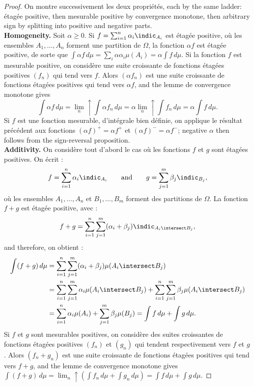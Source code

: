 \begin{proof}
  On montre successivement les deux propriétés, each by the same ladder: étagée
  positive, then mesurable positive by convergence monotone, then arbitrary sign by
  splitting into positive and negative parts.\\

  \textbf{Homogeneity.} Soit $\alpha \geq 0$. Si $f = \sum_{i=1}^{n} \alpha_{i}
  \indic_{A_{i}}$ est étagée positive, où les ensembles $A_{1},\ldots,A_{n}$ forment
  une partition de $\Omega$, la fonction $\alpha f$ est étagée positive, de sorte
  que $\int \alpha f \, d\mu = \sum_{i} \alpha \alpha_{i} \mu(A_{i}) = \alpha \int f
  \, d\mu$. Si la fonction $f$ est mesurable positive, on considère une suite
  croissante de fonctions étagées positives $(f_{n})$ qui tend vers $f$. Alors
  $(\alpha f_{n})$ est une suite croissante de fonctions étagées positives qui tend
  vers $\alpha f$, and the lemme de convergence monotone gives
  \[
    \int \alpha f \, d\mu = \lim_{n} \uparrow \int \alpha f_{n} \, d\mu
    = \alpha \lim_{n} \uparrow \int f_{n} \, d\mu = \alpha \int f \, d\mu .
  \]
  Si $f$ est une fonction mesurable, d'intégrale bien définie, on applique le
  résultat précédent aux fonctions $(\alpha f)^{+} = \alpha f^{+}$ et $(\alpha
  f)^{-} = \alpha f^{-}$; negative $\alpha$ then follows from the sign-reversal
  proposition.\\

  \textbf{Additivity.} On considère tout d'abord le cas où les fonctions $f$ et $g$
  sont étagées positives. On écrit :
  \[
    f = \sum_{i=1}^{n} \alpha_{i} \indic_{A_{i}}
    \qquad \text{and} \qquad
    g = \sum_{j=1}^{m} \beta_{j} \indic_{B_{j}},
  \]
  où les ensembles $A_{1},\ldots,A_{n}$ et $B_{1},\ldots,B_{m}$ forment des
  partitions de $\Omega$. La fonction $f + g$ est étagée positive, avec :
  \[
    f + g = \sum_{i=1}^{n} \sum_{j=1}^{m} (\alpha_{i} + \beta_{j})
      \indic_{A_{i} \intersect B_{j}} ,
  \]
  and therefore, on obtient :
  \begin{align*}
    \int (f+g) \, d\mu
      &= \sum_{i=1}^{n} \sum_{j=1}^{m} (\alpha_{i} + \beta_{j})
         \mu(A_{i} \intersect B_{j}) \\
      &= \sum_{i=1}^{n} \sum_{j=1}^{m} \alpha_{i} \mu(A_{i} \intersect B_{j})
       + \sum_{i=1}^{n} \sum_{j=1}^{m} \beta_{j} \mu(A_{i} \intersect B_{j}) \\
      &= \sum_{i=1}^{n} \alpha_{i} \mu(A_{i}) + \sum_{j=1}^{m} \beta_{j} \mu(B_{j})
       = \int f \, d\mu + \int g \, d\mu .
  \end{align*}
  Si $f$ et $g$ sont mesurables positives, on considère des suites croissantes de
  fonctions étagées positives $(f_{n})$ et $(g_{n})$ qui tendent respectivement vers
  $f$ et $g$. Alors $(f_{n} + g_{n})$ est une suite croissante de fonctions étagées
  positives qui tend vers $f+g$, and the lemme de convergence monotone gives $\int
  (f+g) \, d\mu = \lim_{n} \uparrow ( \int f_{n} \, d\mu + \int g_{n} \, d\mu ) =
  \int f \, d\mu + \int g \, d\mu$.


\end{proof}

